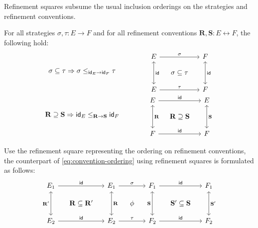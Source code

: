 Refinement squares
subsume the usual inclusion orderings
on the strategies and refinement conventions.
\begin{theorem}
  For all strategies $\sigma, \tau : E \rightarrow F$ and
  for all refinement conventions $\mathbf{R}, \mathbf{S} : E \leftrightarrow F$,
  the following hold:
  \[
    \begin{array}{c@{\qquad\qquad}c}
      \sigma \subseteq \tau \Rightarrow
      \sigma \le_{\kw{id}_E \rightarrow \kw{id}_F} \tau
      &
      \begin{tikzcd}[sep=small]
        E \ar[rr, "\sigma"] \ar[dd, leftrightarrow, "\kw{id}"] && F \ar[dd, leftrightarrow, "\kw{id}"] \\
        & \sigma \subseteq \tau & \\
        E \ar[rr, "\tau"] && F
      \end{tikzcd}
      \\
      \mathbf{R} \supseteq \mathbf{S} \Rightarrow
      \kw{id}_E \le_{\mathbf{R} \rightarrow \mathbf{S}} \kw{id}_F
      &
      \begin{tikzcd}[sep=small]
        E \ar[rr, "\kw{id}"] \ar[dd, leftrightarrow, "\mathbf{R}"] && E \ar[dd, leftrightarrow, "\mathbf{S}"] \\
        & \mathbf{R} \supseteq \mathbf{S} & \\
        F \ar[rr, "\kw{id}"] && F
      \end{tikzcd}
    \end{array}
  \]
\end{theorem}

Use the refinement square representing the ordering on refinement conventions,
the counterpart of \eqref{eq:convention-ordering}
using refinement squares
is formulated as follows:
\[
  \begin{tikzcd}[sep=small]
    E_1
    \ar[rr, rightarrow, "\kw{id}"]
    \ar[dd, leftrightarrow, "\mathbf{R'}"']
    && E_1
    \ar[rr, "\sigma"] \ar[dd, leftrightarrow, "\mathbf{R}"]
    && F_1
    \ar[rr, rightarrow, "\kw{id}"]
    \ar[dd, leftrightarrow, "\mathbf{S}"']
    && F_1
    \ar[dd, leftrightarrow, "\mathbf{S'}"]
    \\
    & \mathbf{R} \subseteq \mathbf{R'} && \phi && \mathbf{S'} \subseteq \mathbf{S}
    \\
    E_2
    \ar[rr, rightarrow, "\kw{id}"]
    && E_2 \ar[rr, "\tau"] &&
    F_2
    \ar[rr, rightarrow, "\kw{id}"]
    && F_2
  \end{tikzcd}
\]

